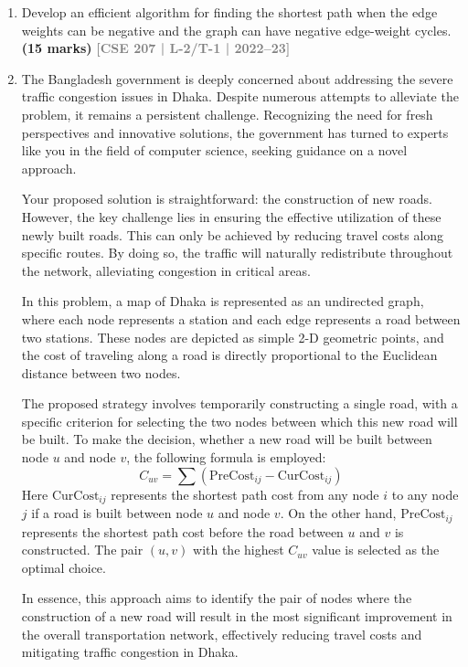 \documentclass[12pt,a3paper]{article}
\newcommand{\yr}[1]{\hfill\textcolor{gray}{\small\textbf{[#1]}}}
\newcommand{\mk}[1]{\textcolor{orange!70!black}{\small\textbf{(#1 marks)}}}
\begin{document}
\begin{enumerate}
\item Develop an efficient algorithm for finding the shortest path when the edge weights can be negative and the graph can have negative edge-weight cycles.
\mk{15} \yr{CSE 207 | L-2/T-1 | 2022--23}

\item The Bangladesh government is deeply concerned about addressing the severe traffic congestion issues in Dhaka. Despite numerous attempts to alleviate the problem, it remains a persistent challenge. Recognizing the need for fresh perspectives and innovative solutions, the government has turned to experts like you in the field of computer science, seeking guidance on a novel approach.

Your proposed solution is straightforward: the construction of new roads. However, the key challenge lies in ensuring the effective utilization of these newly built roads. This can only be achieved by reducing travel costs along specific routes. By doing so, the traffic will naturally redistribute throughout the network, alleviating congestion in critical areas.

In this problem, a map of Dhaka is represented as an undirected graph, where each node represents a station and each edge represents a road between two stations. These nodes are depicted as simple 2-D geometric points, and the cost of traveling along a road is directly proportional to the Euclidean distance between two nodes.

The proposed strategy involves temporarily constructing a single road, with a specific criterion for selecting the two nodes between which this new road will be built. To make the decision, whether a new road will be built between node $u$ and node $v$, the following formula is employed:
\[
C_{uv} = \sum \left( \text{PreCost}_{ij} - \text{CurCost}_{ij} \right)
\]
Here $\text{CurCost}_{ij}$ represents the shortest path cost from any node $i$ to any node $j$ if a road is built between node $u$ and node $v$. On the other hand, $\text{PreCost}_{ij}$ represents the shortest path cost before the road between $u$ and $v$ is constructed. The pair $(u,v)$ with the highest $C_{uv}$ value is selected as the optimal choice.

In essence, this approach aims to identify the pair of nodes where the construction of a new road will result in the most significant improvement in the overall transportation network, effectively reducing travel costs and mitigating traffic congestion in Dhaka.


\end{enumerate}
\end{document}
